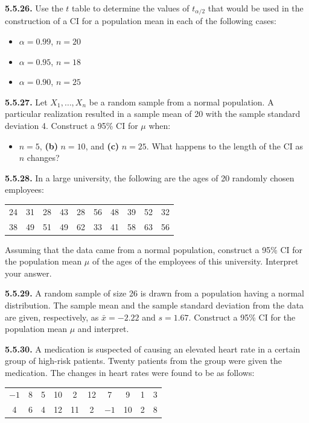 \textbf{5.5.26.} Use the $t$ table to determine the values of $t_{\alpha/2}$ that would be used in the construction of a CI for a population mean in each of the following cases:
\begin{itemize}
    \item[(a)] $\alpha = 0.99$, $n = 20$
    \item[(b)] $\alpha = 0.95$, $n = 18$
    \item[(c)] $\alpha = 0.90$, $n = 25$
\end{itemize}

\textbf{5.5.27.} Let $X_1, \ldots, X_n$ be a random sample from a normal population. A particular realization resulted in a sample mean of 20 with the sample standard deviation 4. Construct a 95\% CI for $\mu$ when:
\begin{itemize}
    \item[(a)] $n = 5$, \textbf{(b)} $n = 10$, and \textbf{(c)} $n = 25$. What happens to the length of the CI as $n$ changes?
\end{itemize}

\textbf{5.5.28.} In a large university, the following are the ages of 20 randomly chosen employees:
\begin{center}
\begin{tabular}{cccccccccc}
24 & 31 & 28 & 43 & 28 & 56 & 48 & 39 & 52 & 32 \\
38 & 49 & 51 & 49 & 62 & 33 & 41 & 58 & 63 & 56
\end{tabular}
\end{center}

Assuming that the data came from a normal population, construct a 95\% CI for the population mean $\mu$ of the ages of the employees of this university. Interpret your answer.

\textbf{5.5.29.} A random sample of size 26 is drawn from a population having a normal distribution. The sample mean and the sample standard deviation from the data are given, respectively, as $\bar{x} = -2.22$ and $s = 1.67$. Construct a 95\% CI for the population mean $\mu$ and interpret.

\textbf{5.5.30.} A medication is suspected of causing an elevated heart rate in a certain group of high-risk patients. Twenty patients from the group were given the medication. The changes in heart rates were found to be as follows:
\begin{center}
\begin{tabular}{cccccccccc}
$-1$ & 8 & 5 & 10 & 2 & 12 & 7 & 9 & 1 & 3 \\
4 & 6 & 4 & 12 & 11 & 2 & $-1$ & 10 & 2 & 8
\end{tabular}
\end{center}

